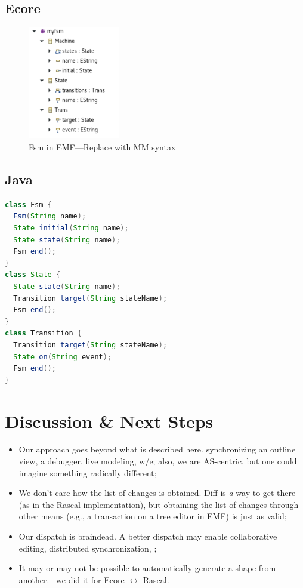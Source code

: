 \documentclass[sigplan]{acmart}
\begin{document}
\subsection{Ecore}
\begin{figure}
	\includegraphics[width=4cm]{figures/fsm-ecore.pdf}
	\caption{Fsm in EMF---Replace with MM syntax}
	\label{fig:fsmEcore}
\end{figure}

\subsection{Java}
\begin{minipage}{\columnwidth}
\begin{lstlisting}[label=lst:fsm-api, caption={FSM in Fluent API}, language=Java]
class Fsm {
  Fsm(String name);
  State initial(String name);
  State state(String name);
  Fsm end();
}
class State {
  State state(String name);
  Transition target(String stateName);
  Fsm end();
}
class Transition {
  Transition target(String stateName);
  State on(String event);
  Fsm end();
}
\end{lstlisting}
\end{minipage}

\section{Discussion \& Next Steps}

\begin{itemize}
	\item Our approach goes beyond what is described here. \eg synchronizing an outline view, a debugger, live modeling, w/e; also, we are AS-centric, but one could imagine something radically different;
	\item We don’t care how the list of changes is obtained. Diff is \emph{a} way to get there (as in the Rascal implementation), but obtaining the list of changes through other means (e.g., a transaction on a tree editor in EMF) is just as valid;
	\item Our dispatch is braindead. A better dispatch may enable collaborative editing, distributed synchronization, \etc;
	\item It may or may not be possible to automatically generate a shape from another. \eg~we did it for Ecore $\leftrightarrow$ Rascal.
\end{itemize}

\clearpage
\balance


\end{document}
